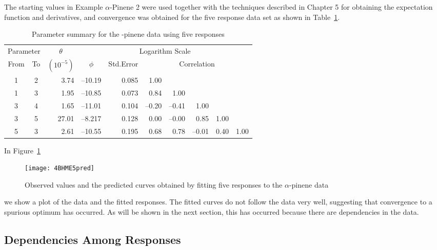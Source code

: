 \begin{example}\label{pin:3}

The starting values in Example $\alpha$-Pinene 2 were used together with
the techniques described in
Chapter 5 for obtaining the expectation function and derivatives, and
convergence was obtained for the five response data set as shown
in Table~\ref{tbl:4.5}.
\begin{table}
  \caption{\label{tbl:4.5}
  Parameter summary for the -pinene data using five responses}
  \begin{center}
    \begin{tabular}{ccrrrrrrrr}\hline
      \multicolumn{2}{c}{Parameter} & \multicolumn{1}{c}{$\theta$} &
      \multicolumn{7}{c}{Logarithm Scale}\\
      \multicolumn{1}{c}{From} &\multicolumn{1}{c}{To} &
      \multicolumn{1}{c}{$( 10^{-5} )$}  & \multicolumn{1}{c}{$\phi$}
      & \multicolumn{1}{c}{Std.Error} & \multicolumn{5}{c}{Correlation}\\ \hline
      1&2&3.74&--10.19&0.085&1.00\\
      1&3&1.95&--10.85&0.073&0.84&1.00\\
      3&4&1.65&--11.01&0.104&--\/0.20&--\/0.41&1.00\\
      3&5&27.01&--8.217&0.128&0.00&--\/0.00&0.85&1.00\\
      5&3&2.61&--10.55&0.195&0.68&0.78&--\/0.01&0.40&1.00\\ \hline
    \end{tabular}
  \end{center}
\end{table}
In Figure~\ref{fig:BHME5pred}
\begin{figure}
  \centerline{\texttt{[image: 4BHME5pred]}}%
  \caption{\label{fig:BHME5pred}
  Observed values and the predicted curves obtained by fitting five
  responses to the $\alpha$-pinene data}
\end{figure}
we show a plot of the data and the fitted
responses.
The fitted curves do not follow the data very well, suggesting
that convergence to a spurious optimum has occurred.
As will be shown in the next section, this has occurred
because there are dependencies in the data.
\end{example}

\subsection{Dependencies Among Responses}

